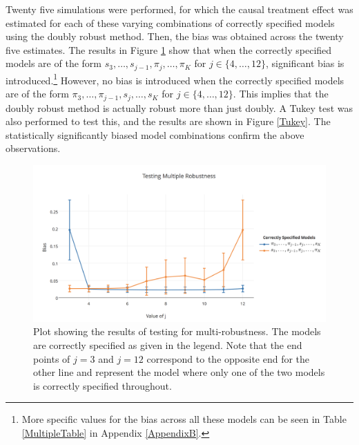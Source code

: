 Twenty five simulations were performed, for which the causal treatment effect was estimated for each of these varying combinations of correctly specified models using the doubly robust method.   Then, the bias was obtained across the twenty five estimates.  The results in Figure \ref{multirobust} show that when the correctly specified models are of the form $s_3, \dots, s_{j-1}, \pi_j, \dots, \pi_K$ for $j \in \{4, \dots, 12 \} $, significant bias is introduced.\footnote{More specific values for the bias across all these models can be seen in Table \ref{MultipleTable} in Appendix \ref{AppendixB}.}  However, no bias is introduced when the correctly specified models are of the form $\pi_3, \dots, \pi_{j-1}, s_j, \dots, s_K $ for  $j \in \{4, \dots, 12 \}$.  This implies that the doubly robust method is actually robust more than just doubly.  A Tukey test was also performed to test this, and the results are shown in Figure \ref{Tukey}.  The statistically significantly biased model combinations confirm the above observations.  

\begin{figure}[h!]
\includegraphics[width = .9\linewidth]{figures/multiplerobust.png}
\caption{Plot showing the results of testing for multi-robustness.  The models are correctly specified as given in the legend.  Note that the end points of $j=3$ and $j=12$ correspond to the opposite end for the other line and represent the model where only one of the two models is correctly specified throughout.}
\label{multirobust}
\end{figure} 

